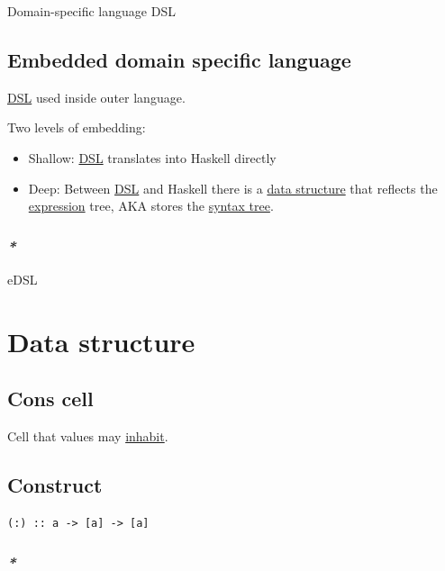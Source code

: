 \documentclass[a4paper,14pt,oneside]{book}
\begin{document}
\label{org3737ba4}Domain-specific language
\label{org0421872}DSL

\subsection{\label{org1eea427}Embedded domain specific language}
\label{sec:orge3d12aa}

\hyperref[org0421872]{DSL} used inside outer language.

Two levels of embedding:

\begin{itemize}
\item Shallow: \hyperref[org0421872]{DSL} translates into Haskell directly
\item Deep: Between \hyperref[org0421872]{DSL} and Haskell there is a \hyperref[org2fd7429]{data structure} that reflects the \hyperref[orgca36393]{expression} tree, AKA stores the \hyperref[org5d034d9]{syntax tree}.
\end{itemize}

\subsubsection{\emph{*}}
\label{sec:orgc5af86f}

\label{org502811d}eDSL

\section{\label{org2fd7429}Data structure}
\label{sec:orgc47119b}
\subsection{\label{orgad78598}Cons cell}
\label{sec:org6a59cb1}
Cell that values may \hyperref[org02428ff]{inhabit}.

\subsection{\label{org44e6354}Construct}
\label{sec:orgad735b2}
\begin{verbatim}
(:) :: a -> [a] -> [a]
\end{verbatim}

\subsubsection{\emph{*}}
\label{sec:org7ce5be8}
\end{document}
